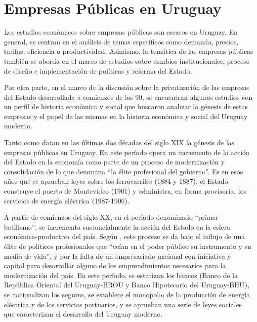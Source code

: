 \documentclass[
  12pt,
  spanish,
]{book}
\begin{document}
\hypertarget{empresas-puxfablicas-en-uruguay}{%
\section{Empresas Públicas en Uruguay}\label{empresas-puxfablicas-en-uruguay}}

Los estudios económicos sobre empresas públicas son escasos en Uruguay. En general, se centran en el análisis de temas específicos como demanda, precios, tarifas, eficiencia o productividad. Asimismo, la temática de las empresas públicas también se aborda en el marco de estudios sobre cambios institucionales, proceso de diseño e implementación de políticas y reforma del Estado.

Por otra parte, en el marco de la discusión sobre la privatización de las empresas del Estado desarrollada a comienzos de los 90, se encuentran algunos estudios con un perfil de historia económica y social que buscaron analizar la génesis de estas empresas y el papel de las mismas en la historia económica y social del Uruguay moderno.

Tanto \citet{Nahum1993} como \citet{Solari1983} datan en las últimas dos décadas del siglo XIX la génesis de las empresas públicas en Uruguay. En este período opera un incremento de la acción del Estado en la economía como parte de un proceso de modernización y consolidación de lo que \citet{Nahum1993} denomina ``la élite profesional del gobierno''. Es en esos años que se aprueban leyes sobre los ferrocarriles (1884 y 1887), el Estado construye el puerto de Montevideo (1901) y administra, en forma provisoria, los servicios de energía eléctrica (1987-1906).

A partir de comienzos del siglo XX, en el período denominado ``primer batllismo'', se incrementa sustancialmente la acción del Estado en la esfera económica-productiva del país. Según \citet{Nahum1993}, este proceso se da bajo el influjo de una élite de políticos profesionales que ``veían en el poder público su instrumento y su medio de vida'', y por la falta de un empresariado nacional con iniciativa y capital para desarrollar alguno de los emprendimientos necesarios para la modernización del país. En este período, se estatizan los bancos (Banco de la República Oriental del Uruguay-BROU y Banco Hipotecario del Uruguay-BHU), se nacionalizan los seguros, se establece el monopolio de la producción de energía eléctrica y de los servicios portuarios, y se aprueban una serie de leyes sociales que caracterizan el desarrollo del Uruguay moderno.
\end{document}
